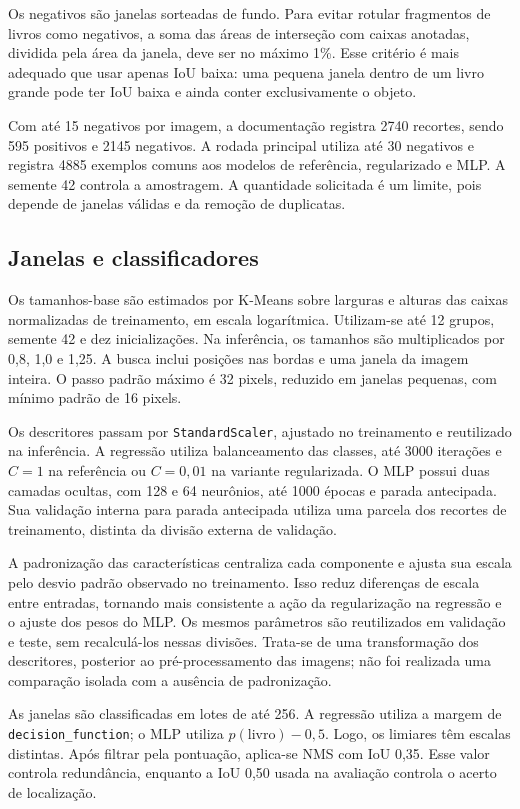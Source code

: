 \documentclass[12pt,a4paper,twocolumn]{article}
\begin{document}
Os negativos são janelas sorteadas de fundo. Para evitar rotular fragmentos de livros como negativos, a soma das áreas de interseção com caixas anotadas, dividida pela área da janela, deve ser no máximo 1\%. Esse critério é mais adequado que usar apenas IoU baixa: uma pequena janela dentro de um livro grande pode ter IoU baixa e ainda conter exclusivamente o objeto.

Com até 15 negativos por imagem, a documentação registra 2740 recortes, sendo 595 positivos e 2145 negativos. A rodada principal utiliza até 30 negativos e registra 4885 exemplos comuns aos modelos de referência, regularizado e MLP. A semente 42 controla a amostragem. A quantidade solicitada é um limite, pois depende de janelas válidas e da remoção de duplicatas.

\subsection{Janelas e classificadores}
Os tamanhos-base são estimados por K-Means sobre larguras e alturas das caixas normalizadas de treinamento, em escala logarítmica. Utilizam-se até 12 grupos, semente 42 e dez inicializações. Na inferência, os tamanhos são multiplicados por 0,8, 1,0 e 1,25. A busca inclui posições nas bordas e uma janela da imagem inteira. O passo padrão máximo é 32 pixels, reduzido em janelas pequenas, com mínimo padrão de 16 pixels.

Os descritores passam por \texttt{StandardScaler}, ajustado no treinamento e reutilizado na inferência. A regressão utiliza balanceamento das classes, até 3000 iterações e $C=1$ na referência ou $C=0{,}01$ na variante regularizada. O MLP possui duas camadas ocultas, com 128 e 64 neurônios, até 1000 épocas e parada antecipada. Sua validação interna para parada antecipada utiliza uma parcela dos recortes de treinamento, distinta da divisão externa de validação.

A padronização das características centraliza cada componente e ajusta sua escala pelo desvio padrão observado no treinamento. Isso reduz diferenças de escala entre entradas, tornando mais consistente a ação da regularização na regressão e o ajuste dos pesos do MLP. Os mesmos parâmetros são reutilizados em validação e teste, sem recalculá-los nessas divisões. Trata-se de uma transformação dos descritores, posterior ao pré-processamento das imagens; não foi realizada uma comparação isolada com a ausência de padronização.

As janelas são classificadas em lotes de até 256. A regressão utiliza a margem de \texttt{decision\_function}; o MLP utiliza $p(\text{livro})-0{,}5$. Logo, os limiares têm escalas distintas. Após filtrar pela pontuação, aplica-se NMS com IoU 0,35. Esse valor controla redundância, enquanto a IoU 0,50 usada na avaliação controla o acerto de localização.
\end{document}
